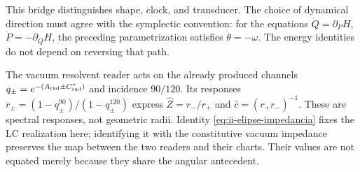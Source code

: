 This bridge distinguishes shape, clock, and transducer. The choice
of dynamical direction must agree with the symplectic convention: for
the equations \(\dot Q=\partial_PH\),
\(\dot P=-\partial_QH\), the preceding parametrization satisfies
\(\dot\theta=-\omega\). The energy identities do not depend
on reversing that path.

The vacuum resolvent reader acts on the already produced channels
\(q_\pm=e^{-(A_{\rm rad}\pm C^*_{\rm rad})}\) and incidence
\(90/120\). Its responses
\(r_\pm=(1-q_\pm^{90})/(1-q_\pm^{120})\) express
\(\widehat Z=r_-/r_+\) and \(\widehat c=(r_+r_-)^{-1}\).
These are spectral responses, not geometric radii. Identity
\eqref{eq:ii-elipse-impedancia} fixes the LC realization here;
identifying it with the constitutive vacuum impedance preserves the map
between the two readers and their charts. Their values are not equated merely because
they share the angular antecedent.
